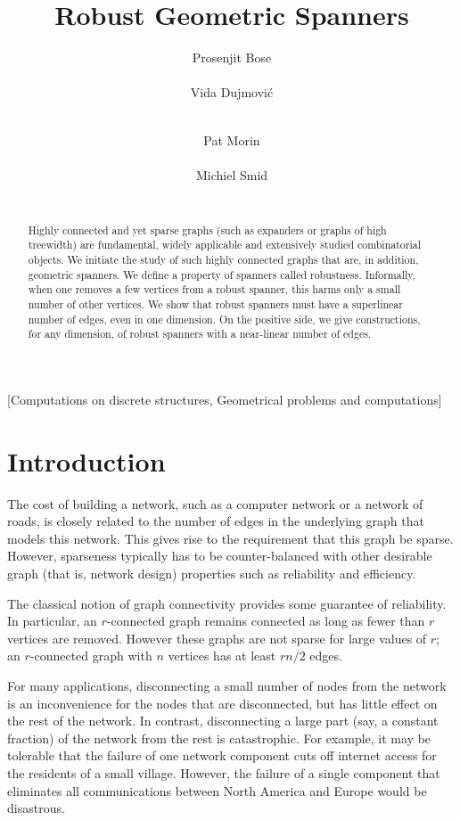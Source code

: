 \documentclass{sig-alternate}
\title{Robust Geometric Spanners}
\author{
\alignauthor
Prosenjit Bose\\
\affaddr{Carleton University}\\
\alignauthor
Vida Dujmovi\'c\\
\affaddr{Carleton University}\\
\and
\alignauthor
Pat Morin\\
\affaddr{Carleton University}\\
\alignauthor
Michiel Smid\\
\affaddr{Carleton University}\\
}
\begin{document}
\maketitle

\begin{abstract}
  Highly connected and yet sparse graphs (such as expanders or graphs
  of high treewidth) are fundamental, widely applicable and extensively
  studied combinatorial objects.  We initiate the study of such highly
  connected graphs that are, in addition, geometric spanners.  We define
  a property of spanners called robustness.  Informally, when one removes
  a few vertices from a robust spanner, this harms only a small number of
  other vertices.  We show that robust spanners must have a superlinear
  number of edges, even in one dimension.  On the positive side, we give
  constructions, for any dimension, of robust spanners with a near-linear
  number of edges.
\end{abstract}

[Computations on discrete structures, Geometrical problems and computations]



\section{Introduction}

The cost of building a network, such as a computer network or a network
of roads, is closely related to the number of edges in the underlying
graph that models this network.  This gives rise to the requirement
that this graph be sparse.  However, sparseness typically has
to be counter-balanced with other desirable graph (that is, network
design) properties such as reliability and efficiency.

The classical notion of graph connectivity provides some guarantee of
reliability. In particular, an $r$-connected graph remains connected as
long as fewer than $r$ vertices are removed. However these graphs are
not sparse for large values of $r$;  an $r$-connected graph with $n$
vertices has at least $rn/2$ edges.

For many applications, disconnecting a small number of nodes from the
network is an inconvenience for the nodes that are disconnected, but has
little effect on the rest of the network.  In contrast, disconnecting
a large part (say, a constant fraction) of the network from the rest
is catastrophic.
For example, it may be tolerable that the failure of one network component
cuts off internet access for the residents of a small village. However,
the failure of a single component that eliminates all communications
between North America and Europe would be disastrous.
\end{document}
